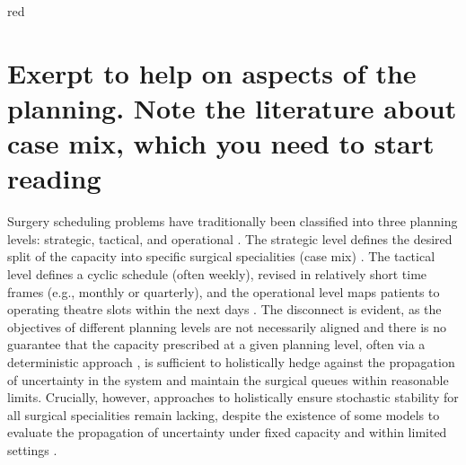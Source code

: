\documentclass[review,3p,authoryear]{elsarticle}
\begin{document}
\begin{color}{red}
\section{Exerpt to help on aspects of the planning. Note the literature about case mix, which you need to start reading}

Surgery scheduling problems have traditionally been classified into three planning levels: strategic, tactical, and operational \citep{Cardoen2010,Calegari2025}. The strategic level defines the desired split of the capacity into specific surgical specialities (case mix) \cite{Burdett2023}. The tactical level \citep{Bovim2020,Siqueira2018INTO,Carneiro2025} defines a cyclic schedule (often weekly), revised in relatively short time frames (e.g., monthly or quarterly), and the operational level maps patients to operating theatre slots within the next days \citep{Vieira2025}. The disconnect is evident, as the objectives of different planning levels are not necessarily aligned \citep{Melo2025} and there is no guarantee that the capacity prescribed at a given planning level, often via a deterministic approach \citep{Mcrae2020,Burdett2023}, is sufficient to holistically hedge against the propagation of uncertainty in the system and maintain the surgical queues within reasonable limits. Crucially, however, approaches to holistically ensure stochastic stability \citep{Meyn2009} for all surgical specialities remain lacking, despite the existence of some models to evaluate the propagation of uncertainty under fixed capacity and within limited settings \citep{Dellaert2016,Freeman2018,Calegari2025}.


\end{color}
\end{document}
